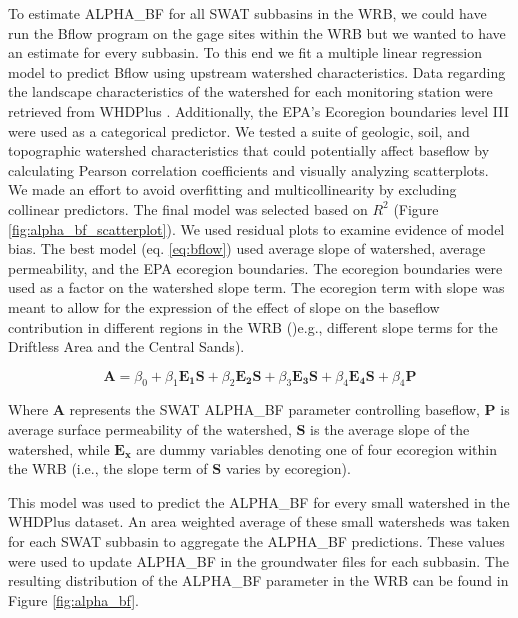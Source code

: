 	To estimate ALPHA\_BF for all SWAT subbasins in the WRB, we could have run the Bflow program on the gage sites within the WRB but we wanted to have an estimate for every subbasin. 
	To this end we fit a multiple linear regression model to predict Bflow using upstream watershed characteristics. 
	Data regarding the landscape characteristics of the watershed for each monitoring station were retrieved from WHDPlus \citep{wdnr_whdplus_2013}.
	Additionally, the EPA's Ecoregion boundaries level III were used as a categorical predictor. 
	We tested a suite of geologic, soil, and topographic watershed characteristics that could potentially affect baseflow by calculating Pearson correlation coefficients and visually analyzing scatterplots.
	We made an effort to avoid overfitting and multicollinearity by excluding collinear predictors. The final model was selected based on $R^2$ (Figure \ref{fig:alpha_bf_scatterplot}). 
	We used residual plots to examine evidence of model bias. 
	The best model (eq. \ref{eq:bflow}) used average slope of watershed, average permeability, and the EPA ecoregion boundaries. The ecoregion boundaries were used as a factor on the watershed slope term. 
	The ecoregion term with slope was meant to allow for the expression of the effect of slope on the baseflow contribution in different regions in the WRB ()e.g., different slope terms for the Driftless Area and the Central Sands).

	\begin{equation}
	\bm{A} = \beta_0 + 
		\beta_1 \bm{E_1} \bm{S} +
		\beta_2 \bm{E_2} \bm{S} + 
		\beta_3 \bm{E_3} \bm{S} +
		\beta_4 \bm{E_4} \bm{S} +
		\beta_4 \bm{P}
		\label{eq:bflow}
	\end{equation}
	
	Where $\bm{A}$ represents the SWAT ALPHA\_BF parameter controlling baseflow, $\bm{P}$ is average surface permeability of the watershed, $\bm{S}$ is the average slope of the watershed, while $\bm{E_x}$ are dummy variables denoting one of four ecoregion within the WRB (i.e., the slope term of $\bm{S}$ varies by ecoregion).
	
	This model was used to predict the ALPHA\_BF for every small watershed in the WHDPlus dataset. An area weighted average of these small watersheds was taken for each SWAT subbasin to aggregate the ALPHA\_BF predictions. These values were used to update ALPHA\_BF in the groundwater files for each subbasin. The resulting distribution of the ALPHA\_BF parameter in the WRB can be found in Figure \ref{fig:alpha_bf}.
	